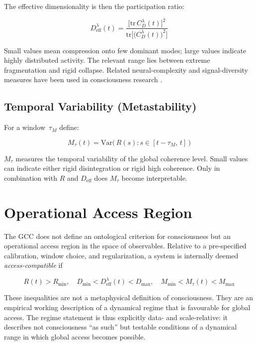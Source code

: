 \documentclass[11pt,a4paper]{article}
\theoremstyle{plain}
\theoremstyle{definition}
\theoremstyle{remark}
\newcommand{\Deff}{D_{\mathrm{eff}}}
\newcommand{\Mtau}{M_{\tau}}
\newcommand{\Rmin}{R_{\min}}
\newcommand{\Dmin}{D_{\min}}
\newcommand{\Dmax}{D_{\max}}
\newcommand{\Mmin}{M_{\min}}
\newcommand{\Mmax}{M_{\max}}
\begin{document}
The effective dimensionality is then the participation ratio:

\begin{equation}
\label{eq:Deff}
\boxed{\;\Deff^{\lambda}(t) = \frac{\bigl[\mathrm{tr}\,C_D^{\lambda}(t)\bigr]^2}{\mathrm{tr}\!\bigl[\bigl(C_D^{\lambda}(t)\bigr)^2\bigr]}\;}
\end{equation}

Small values mean compression onto few dominant modes; large values indicate highly distributed activity. The relevant range lies between extreme fragmentation and rigid collapse. Related neural-complexity and signal-diversity measures have been used in consciousness research \citep{schartner2015,luppi2019}.

\subsection{Temporal Variability (Metastability)}

For a window~$\tau_M$ define:

\begin{equation}
\label{eq:Mtau}
\Mtau(t) = \mathrm{Var}\!\bigl(\,R(s) : s \in [t - \tau_M,\, t]\,\bigr)
\end{equation}

$\Mtau$ measures the temporal variability of the global coherence level. Small values can indicate either rigid disintegration or rigid high coherence. Only in combination with $R$ and $\Deff$ does $\Mtau$ become interpretable.


\section{Operational Access Region}
\label{sec:access-region}
\label{sec:zugang}

The GCC does not define an ontological criterion for consciousness but an operational access region in the space of observables. Relative to a pre-specified calibration, window choice, and regularization, a system is internally deemed \emph{access-compatible} if

\begin{equation}
\label{eq:zugang}
\boxed{\;
R(t) > \Rmin, \quad
\Dmin < \Deff^{\lambda}(t) < \Dmax, \quad
\Mmin < \Mtau(t) < \Mmax
\;}
\end{equation}

These inequalities are not a metaphysical definition of consciousness. They are an empirical working description of a dynamical regime that is favourable for global access. The regime statement is thus explicitly data- and scale-relative: it describes not consciousness ``as such'' but testable conditions of a dynamical range in which global access becomes possible.
\end{document}
